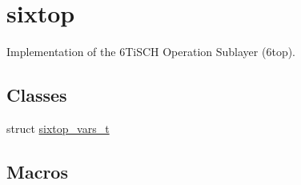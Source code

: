 \hypertarget{group__sixtop}{}\section{sixtop}
\label{group__sixtop}


Implementation of the 6\+Ti\+S\+CH Operation Sublayer (6top).  


\subsection*{Classes}
\begin{DoxyCompactItemize}
\item 
struct \hyperlink{structsixtop__vars__t}{sixtop\+\_\+vars\+\_\+t}
\end{DoxyCompactItemize}
\subsection*{Macros}
